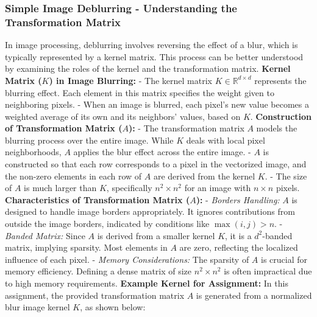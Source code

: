 \documentclass[unicode,11pt,a4paper,oneside,numbers=endperiod,openany]{scrartcl}
\begin{document}
\subsubsection{Simple Image Deblurring - Understanding the Transformation Matrix}
In image processing, deblurring involves reversing the effect of a blur, which is typically represented by a kernel matrix. This process can be better understood by examining the roles of the kernel and the transformation matrix.
\newline \newline
\textbf{Kernel Matrix (\( K \)) in Image Blurring:}
- The kernel matrix \( K \in \mathbb{R}^{d \times d} \) represents the blurring effect. Each element in this matrix specifies the weight given to neighboring pixels.
- When an image is blurred, each pixel's new value becomes a weighted average of its own and its neighbors' values, based on \( K \).
\newline \newline
\textbf{Construction of Transformation Matrix (\( A \)):}
- The transformation matrix \( A \) models the blurring process over the entire image. While \( K \) deals with local pixel neighborhoods, \( A \) applies the blur effect across the entire image.
- \( A \) is constructed so that each row corresponds to a pixel in the vectorized image, and the non-zero elements in each row of \( A \) are derived from the kernel \( K \).
- The size of \( A \) is much larger than \( K \), specifically \( n^2 \times n^2 \) for an image with \( n \times n \) pixels.
\newline \newline
\textbf{Characteristics of Transformation Matrix (\( A \)):} \newline
- \textit{Borders Handling:} \( A \) is designed to handle image borders appropriately. It ignores contributions from outside the image borders, indicated by conditions like \( \max(i, j) > n \). \newline
- \textit{Banded Matrix:} Since \( A \) is derived from a smaller kernel \( K \), it is a \( d^2 \)-banded matrix, implying sparsity. Most elements in \( A \) are zero, reflecting the localized influence of each pixel. \newline
- \textit{Memory Considerations:} The sparsity of \( A \) is crucial for memory efficiency. Defining a dense matrix of size \( n^2 \times n^2 \) is often impractical due to high memory requirements.
\newline \newline
\textbf{Example Kernel for Assignment:}
In this assignment, the provided transformation matrix \( A \) is generated from a normalized blur image kernel \( K \), as shown below:
\end{document}
